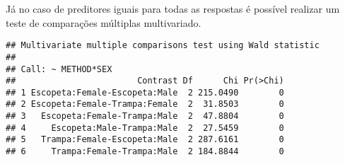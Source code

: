 Já no caso de preditores iguais para todas as respostas é possível realizar um teste de comparações múltiplas multivariado.

\begin{knitrout}
\color{fgcolor}\begin{kframe}
\begin{alltt}
\hlstd{(} 
                  \hlstd{=} \hlstd{(}\hlstd{,} \hlstd{),}
                  
\end{alltt}
\begin{verbatim}
## Multivariate multiple comparisons test using Wald statistic
## 
## Call: ~ METHOD*SEX
##                        Contrast Df      Chi Pr(>Chi)
## 1 Escopeta:Female-Escopeta:Male  2 215.0490        0
## 2 Escopeta:Female-Trampa:Female  2  31.8503        0
## 3   Escopeta:Female-Trampa:Male  2  47.8804        0
## 4     Escopeta:Male-Trampa:Male  2  27.5459        0
## 5   Trampa:Female-Escopeta:Male  2 287.6161        0
## 6     Trampa:Female-Trampa:Male  2 184.8844        0
\end{verbatim}
\end{kframe}
\end{knitrout}

